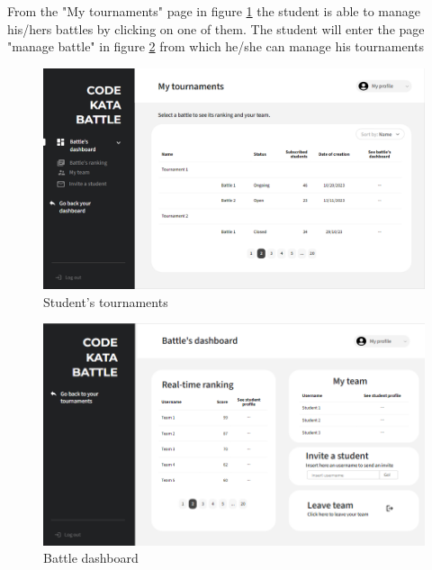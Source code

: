 From the "My tournaments" page in figure \ref{fig:SmyT} the student is able to manage his/hers battles by clicking on one of them. The student will enter the page "manage battle" in figure \ref{fig:battleDash} from which he/she can manage his tournaments
\begin{figure}[h]
    \centering
    \includegraphics[width=\textwidth]{images/mockups/students/MyTournaments.png}
    \caption{Student's tournaments}
    \label{fig:SmyT}
\end{figure}

\begin{figure}[h]
    \centering
    \includegraphics[width=\textwidth]{images/mockups/students/BattleDashboard.png}
    \caption{Battle dashboard}
    \label{fig:battleDash}
\end{figure}

